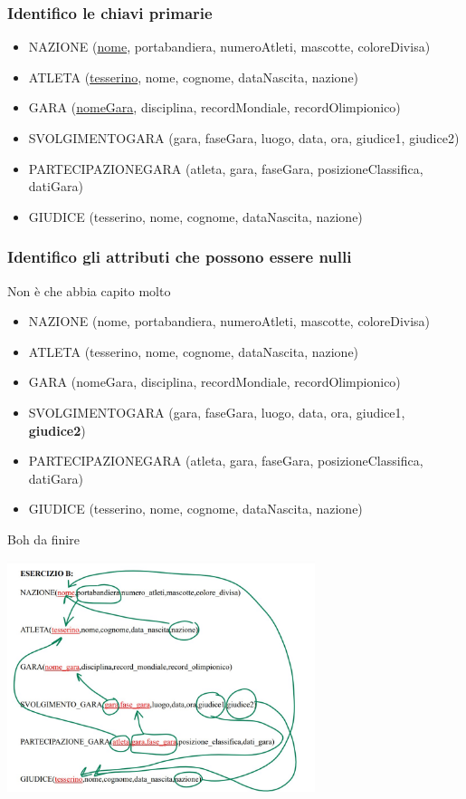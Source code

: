 \subsubsection{Identifico le chiavi primarie}
\begin{itemize}
    \item NAZIONE (\underline{nome}, portabandiera, numeroAtleti, mascotte, coloreDivisa)
    \item ATLETA (\underline{tesserino}, nome, cognome, dataNascita, nazione)
    \item GARA (\underline{nomeGara}, disciplina, recordMondiale, recordOlimpionico)
    \item SVOLGIMENTOGARA (gara, faseGara, luogo, data, ora, giudice1, giudice2)
    \item PARTECIPAZIONEGARA (atleta, gara, faseGara, posizioneClassifica, datiGara)
    \item GIUDICE (tesserino, nome, cognome, dataNascita, nazione)
\end{itemize}

\subsubsection{Identifico gli attributi che possono essere nulli}
Non è che abbia capito molto
\begin{itemize}
    \item NAZIONE (nome, portabandiera, numeroAtleti, mascotte, coloreDivisa)
    \item ATLETA (tesserino, nome, cognome, dataNascita, nazione)
    \item GARA (nomeGara, disciplina, recordMondiale, recordOlimpionico)
    \item SVOLGIMENTOGARA (gara, faseGara, luogo, data, ora, giudice1, \textbf{giudice2})
    \item PARTECIPAZIONEGARA (atleta, gara, faseGara, posizioneClassifica, datiGara)
    \item GIUDICE (tesserino, nome, cognome, dataNascita, nazione)
\end{itemize}
Boh da finire
\begin{center}
    \includegraphics[width=0.675\textwidth]{chaptersLezioniSara/img/MR_fileesB.jpg}
\end{center}

